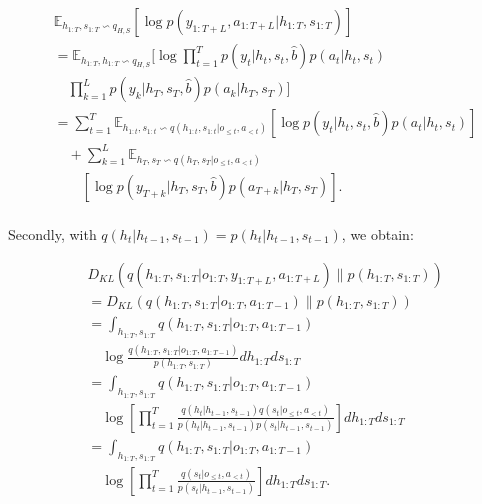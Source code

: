 \begin{footnotesize} 
	\begin{equation} \label{4}
	\begin{aligned}
	&\mathbb{E}_{h_{1:T},s_{1:T}\backsim q_{H,S}}[\log p(y_{1:T+L},a_{1:T+L}|h_{1:T},s_{1:T})]\\ &=\mathbb{E}_{h_{1:T},h_{1:T}\backsim q_{H,S}}[\log\displaystyle\prod_{t=1}^{T}p(y_t|h_t,s_t,\hat{b})p(a_t|h_t,s_t)\\
	&\quad \displaystyle\prod_{k=1}^{L}p(y_k|h_T,s_T,\hat{b})p(a_k|h_T,s_T)] \\
	&=\displaystyle\sum_{t=1}^{T}\mathbb{E}_{h_{1:t},s_{1:t}\backsim q(h_{1:t},s_{1:t}|o_{\leq t},a_{<t})}[\log p(y_t|h_t,s_t,\hat{b})p(a_t|h_t,s_t)]\\   
	&\quad  +  \displaystyle\sum_{k=1}^{L}\mathbb{E}_{h_{T},s_{T}\backsim q(h_{T},s_{T}|o_{\leq t},a_{<t})} \\
	&\qquad[\log p(y_{T+k}|h_T,s_T,\hat{b})p(a_{T+k}|h_T,s_T)].\\  
	\end{aligned}
	\end{equation} 
\end{footnotesize}

Secondly, with $q(h_t|h_{t-1},s_{t-1})=p(h_t|h_{t-1},s_{t-1})$, we obtain:

\begin{footnotesize} 
	\begin{equation} \label{5}
	\begin{aligned}
	&D_{KL}(q(h_{1:T},s_{1:T}|o_{1:T},y_{1:T+L},a_{1:T+L})\parallel p(h_{1:T},s_{1:T}))\\
	&=D_{KL}(q(h_{1:T},s_{1:T}|o_{1:T},a_{1:T-1})\parallel p(h_{1:T},s_{1:T}))\\
	&=\int_{{h_{1:T},s_{1:T}}}q(h_{1:T},s_{1:T}|o_{1:T},a_{1:T-1}) \\
	&\quad\log \frac{q(h_{1:T},s_{1:T}|o_{1:T},a_{1:T-1})}{p(h_{1:T},s_{1:T})} d h_{1:T} d s_{1:T} \\
	&=\int_{{h_{1:T},s_{1:T}}}q(h_{1:T},s_{1:T}|o_{1:T},a_{1:T-1}) \\
	&\quad \log [\displaystyle\prod_{t=1}^{T}\frac{q(h_{t}|h_{t-1},s_{t-1})q(s_t|o_{\leq t},a_{<t})}{p(h_t|h_{t-1},s_{t-1})p(s_t|h_{t-1},s_{t-1})}] d h_{1:T} d s_{1:T}\\ 
	&= \int_{{h_{1:T},s_{1:T}}}q(h_{1:T},s_{1:T}|o_{1:T},a_{1:T-1}) \\
	&\quad \log [\displaystyle\prod_{t=1}^{T}\frac{q(s_t|o_{\leq t},a_{<t})}{p(s_t|h_{t-1},s_{t-1})}] d h_{1:T} d s_{1:T}.\\  
	\end{aligned}
	\end{equation} 
\end{footnotesize}

